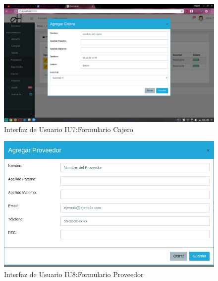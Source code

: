 \begin{figure}[htbp!]
	\begin{center}
\includegraphics[width=\textwidth]{Pantallas/FormulariCajero}
		\caption{Interfaz de Usuario IU7:Formulario Cajero}
	\end{center}
\end{figure}



\begin{figure}[htbp!]
	\begin{center}
\includegraphics[width=\textwidth]{Pantallas/ProveedorFormulario}
		\caption{Interfaz de Usuario IU8:Formulario Proveedor}
	\end{center}
\end{figure}


